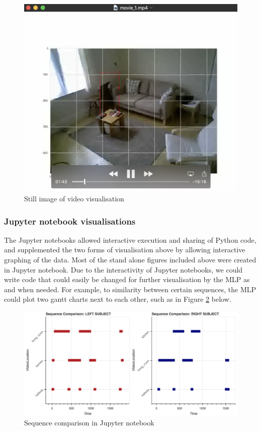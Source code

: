 \documentclass[fleqn,10pt]{SelfArx} %
\begin{document}
\begin{figure}[!h] \centering
	\includegraphics[scale=0.4]{video} 
	\caption{Still image of video visualisation}
	\label{fig:video}
\end{figure}

\subsubsection{Jupyter notebook visualisations}
The Jupyter notebooks allowed interactive execution and sharing of Python code, and supplemented the two forms of visualisation above by allowing interactive graphing of the data. Most of the stand alone figures included above were created in Jupyter notebook. Due to the interactivity of Jupyter notebooks, we could write code that could easily be changed for further visualisation by the MLP as and when needed. For example, to similarity between certain sequences, the MLP could plot two gantt charts next to each other, such as in Figure \ref{fig:seq-comp} below. \\

\begin{figure}[!h] \centering
	\includegraphics[scale=0.3]{seq-comp} 
	\caption{Sequence comparison in Jupyter notebook}
	\label{fig:seq-comp}
\end{figure}
\end{document}
